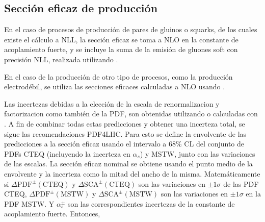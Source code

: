 \subsection{Sección eficaz de producción}


En el caso de procesos de producción de pares de gluinos o squarks, de los cuales
existe el cálculo a NLL, la sección eficaz se toma a NLO en la constante de acoplamiento
fuerte, y se incluye la suma de la emisión de gluones soft con precisión NLL,
realizada utilizando {\nllfast}\cite{Kramer:2012bx,Beenakker:1996ch,Kulesza:2008jb,Kulesza:2009kq,Beenakker:2009ha,Beenakker:2011fu}
.

En el caso de la producción de otro tipo de procesos, como la producción electrodébil, se utiliza
las secciones eficaces calculadas a NLO usando {\prospino}.


\newcommand{\pdfcteqpm}{\ensuremath{\Delta\mathrm{PDF}^{\pm}(\mathrm{CTEQ})}}
\newcommand{\scacteqpm}{\ensuremath{\Delta\mathrm{SCA}^{\pm}(\mathrm{CTEQ})}}

\newcommand{\pdfmstwpm}{\ensuremath{\Delta\mathrm{PDF}^{\pm}(\mathrm{MSTW})}}
\newcommand{\scamstwpm}{\ensuremath{\Delta\mathrm{SCA}^{\pm}(\mathrm{MSTW})}}

\newcommand{\alphap}{\ensuremath{\alpha_s_+}}
\newcommand{\alpham}{\ensuremath{\alpha_s^-}}
\newcommand{\alphapm}{\ensuremath{\alpha_s^{\pm}}}

Las incertezas debidas a la elección de la escala de renormalizacion y
factorizacion como también de la PDF, son obtenidas utilizando {\nllfast} o
calculadas con {\prospino}. A fin de combinar todas estas predicciones y obtener
una incerteza total, se sigue las recomendaciones PDF4LHC\cite{Botje:2011sn}.
Para esto se define la envolvente de las predicciones a la sección eficaz usando
el intervalo a 68\% CL del conjunto de PDFs CTEQ (incluyendo la incerteza en
$\alpha_s$) y MSTW, junto con las variaciones de las escalas. La sección eficaz
nominal se obtiene usando el punto medio de la envolvente y la incerteza como la
mitad del ancho de la misma. Matemáticamente si {\pdfcteqpm} y {\scacteqpm} son
las variaciones en $\pm 1\sigma$ de las PDF CTEQ,  {\pdfmstwpm} y {\scamstwpm}
son las variaciones en $\pm 1\sigma$ en la PDF MSTW. Y {\alphapm} son las
correspondientes incertezas de la constante de acoplamiento fuerte. Entonces,

